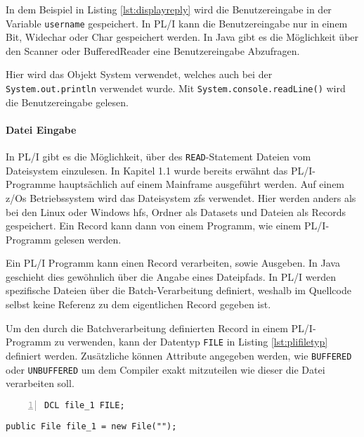 In dem Beispiel in Listing \ref{lst:displayreply} wird die Benutzereingabe in der
Variable \verb+username+ gespeichert.
In PL/I kann die Benutzereingabe nur in einem Bit, Widechar oder Char gespeichert werden. 
In Java gibt es die Möglichkeit über den Scanner oder BufferedReader eine Benutzereingabe Abzufragen.

Hier wird das Objekt System verwendet, welches auch bei der \verb+System.out.println+ verwendet wurde.
Mit \verb+System.console.readLine()+ wird die Benutzereingabe gelesen.

\pagebreak
\paragraph{Datei Eingabe}
In PL/I gibt es die Möglichkeit, über des \verb+READ+-Statement Dateien vom Dateisystem einzulesen.
In Kapitel 1.1 wurde bereits erwähnt das PL/I-Programme hauptsächlich auf einem Mainframe ausgeführt werden.
Auf einem z/Os Betriebssystem wird das Dateisystem \ac{zfs} verwendet.
Hier werden anders als bei den  Linux oder Windows \ac{hfs}, Ordner als Datasets und Dateien als Records gespeichert.
Ein Record kann dann von einem Programm, wie einem PL/I-Programm gelesen werden.

Ein PL/I Programm kann einen Record verarbeiten, sowie Ausgeben. In Java geschieht dies gewöhnlich über die Angabe eines Dateipfads.
In PL/I werden spezifische Dateien über die Batch-Verarbeitung definiert, weshalb im Quellcode selbst keine Referenz zu dem eigentlichen Record gegeben ist.

Um den durch die Batchverarbeitung definierten Record in einem PL/I-Programm zu verwenden, kann der Datentyp \verb+FILE+ in Listing \ref{lst:plifiletyp} definiert werden. Zusätzliche können Attribute angegeben werden, wie \verb+BUFFERED+ oder \verb+UNBUFFERED+ um dem Compiler exakt mitzuteilen wie dieser die Datei verarbeiten soll.

\begin{minipage}[b]{0.48\linewidth}
	\centering
	\lstset{language=PL/I,label=SliceExaple}
	\begin{lstlisting}[frame=single, numbers=left, mathescape,%
		caption={Dateityp}, label={lst:plifiletyp}]
 DCL file_1 FILE;
	\end{lstlisting}
\end{minipage}
\hspace{0.5cm}
\begin{minipage}[b]{0.48\linewidth}
	\centering
	\lstset{language=Java,label=SliceExaple}
	\begin{lstlisting}[frame=single, mathescape,%
		title={" "}]
 public File file_1 = new File("");
	\end{lstlisting}
\end{minipage}  

